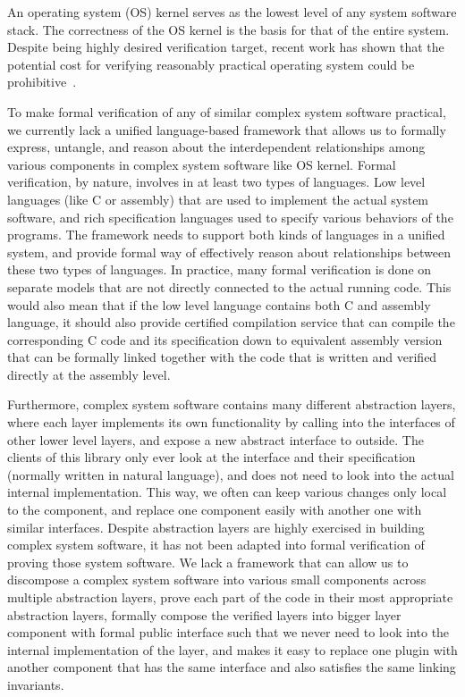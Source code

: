 An operating system (OS) kernel serves as the lowest level of any
system software stack. The correctness of the OS kernel is the basis
for that of the entire system.
Despite being highly desired verification target, recent work
has shown that the potential cost for verifying
reasonably practical operating system could be 
prohibitive~\cite{klein2009sel4,klein14}.

To make formal verification of any of similar complex system software
practical, we currently lack a unified language-based framework that allows us
to formally express, untangle, and reason about the interdependent relationships
among various components in complex system software like OS kernel.
Formal verification, by nature, involves in at least two types of languages.
Low level languages (like C or assembly) that are used to implement
the actual system software, and rich specification languages used to specify
various behaviors of the programs. The framework needs to support both
kinds of languages in a unified system, and provide formal way of effectively
reason about relationships between these two types of languages. In practice, many
formal verification is done on separate models that are not directly connected to the
actual running code. This would also mean that if the low level language contains
both C and assembly language, it should also provide certified compilation service
that can compile the corresponding C code and its specification down to equivalent
assembly version that can be formally linked together with the code that is written
and verified directly at the assembly level. 

Furthermore, complex system software contains many different abstraction
layers, where each layer implements its own functionality by calling into the
interfaces of other lower level  layers, and expose a new abstract
interface to outside. The clients of this library only ever look at the
interface and their specification (normally written in natural language),
and does not need to look into the actual internal implementation.
This way, we often can keep various changes only local to the component,
and replace one component easily with another one with similar interfaces.
Despite abstraction layers are highly exercised in building complex
system software, it has not been adapted into formal verification of proving
those system software. We lack a framework that can allow us to discompose
a complex system software into various small components across multiple
abstraction layers, prove each part of the code in their most appropriate abstraction
layers, formally compose the verified layers into bigger layer component with formal
public interface such that we never need to look into the internal implementation of the layer,
and makes it easy to replace one plugin with another component that has the same
interface and also satisfies the same linking invariants.

